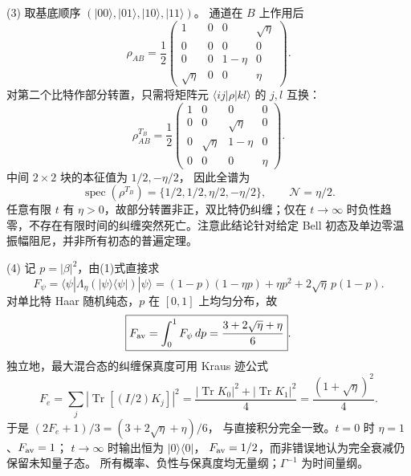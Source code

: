 (3) 取基底顺序 \((|00\rangle,|01\rangle,|10\rangle,|11\rangle)\)。
通道在 \(B\) 上作用后
\[
 \rho_{AB}=\frac12
 \begin{pmatrix}
 1&0&0&\sqrt\eta\\
 0&0&0&0\\
 0&0&1-\eta&0\\
 \sqrt\eta&0&0&\eta
 \end{pmatrix}.
\]
对第二个比特作部分转置，只需将矩阵元
\(\langle ij|\rho|kl\rangle\) 的 \(j,l\) 互换：
\[
 \rho_{AB}^{T_B}=\frac12
 \begin{pmatrix}
 1&0&0&0\\
 0&0&\sqrt\eta&0\\
 0&\sqrt\eta&1-\eta&0\\
 0&0&0&\eta
 \end{pmatrix}.
\]
中间 \(2\times2\) 块的本征值为 \(1/2,-\eta/2\)，
因此全谱为
\[
 \boxed{\operatorname{spec}(\rho^{T_B})=
 \{1/2,1/2,\eta/2,-\eta/2\}},\qquad
 \boxed{\mathcal N=\eta/2}.
\]
任意有限 \(t\) 有 \(\eta>0\)，故部分转置非正，双比特仍纠缠；仅在 \(t\to\infty\) 时负性趋零，不存在有限时间的纠缠突然死亡。注意此结论针对给定 Bell 初态及单边零温振幅阻尼，并非所有初态的普遍定理。

(4) 记 \(p=|\beta|^2\)，由(1)式直接求
\[
 F_\psi=\langle\psi|\Lambda_\eta(|\psi\rangle\langle\psi|)|\psi\rangle
 =(1-p)(1-\eta p)+\eta p^2+2\sqrt\eta\,p(1-p).
\]
对单比特 Haar 随机纯态，\(p\) 在 \([0,1]\) 上均匀分布，故
\[
 \boxed{F_{\rm av}=\int_0^1F_\psi\,dp
 =\frac{3+2\sqrt\eta+\eta}{6}}.
\]
独立地，最大混合态的纠缠保真度可用 Kraus 迹公式
\[
 F_e=\sum_j|\operatorname{Tr}[(I/2)K_j]|^2
 =\frac{|\operatorname{Tr}K_0|^2+|\operatorname{Tr}K_1|^2}{4}
 =\frac{(1+\sqrt\eta)^2}{4}.
\]
于是 \((2F_e+1)/3=(3+2\sqrt\eta+\eta)/6\)，
与直接积分完全一致。\(t=0\) 时 \(\eta=1\)、\(F_{\rm av}=1\)；
\(t\to\infty\) 时输出恒为 \(|0\rangle\langle0|\)，
\(F_{\rm av}=1/2\)，而非错误地认为完全衰减仍保留未知量子态。
所有概率、负性与保真度均无量纲；\(\Gamma^{-1}\) 为时间量纲。
